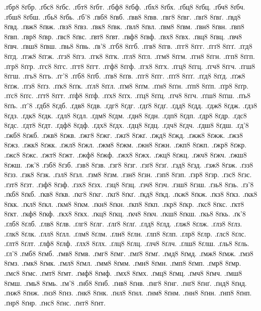 {.ґбр8 8ґбр.
.ґбс8 8ґбс.
.ґбт8 8ґбт.
.ґбф8 8ґбф.
.ґбх8 8ґбх.
.ґбц8 8ґбц.
.ґбч8 8ґбч.
.ґбш8 8ґбш.
.ґбь8 8ґбь.
.ґб'8
.ґвб8 8ґвб.
.ґвв8 8ґвв.
.ґвг8 8ґвг.
.ґвґ8 8ґвґ.
.ґвд8 8ґвд.
.ґвж8 8ґвж.
.ґвз8 8ґвз.
.ґвк8 8ґвк.
.ґвл8 8ґвл.
.ґвм8 8ґвм.
.ґвн8 8ґвн.
.ґвп8 8ґвп.
.ґвр8 8ґвр.
.ґвс8 8ґвс.
.ґвт8 8ґвт.
.ґвф8 8ґвф.
.ґвх8 8ґвх.
.ґвц8 8ґвц.
.ґвч8 8ґвч.
.ґвш8 8ґвш.
.ґвь8 8ґвь.
.ґв'8
.ґгб8 8ґгб.
.ґгв8 8ґгв.
.ґгг8 8ґгг.
.ґгґ8 8ґгґ.
.ґгд8 8ґгд.
.ґгж8 8ґгж.
.ґгз8 8ґгз.
.ґгк8 8ґгк.
.ґгл8 8ґгл.
.ґгм8 8ґгм.
.ґгн8 8ґгн.
.ґгп8 8ґгп.
.ґгр8 8ґгр.
.ґгс8 8ґгс.
.ґгт8 8ґгт.
.ґгф8 8ґгф.
.ґгх8 8ґгх.
.ґгц8 8ґгц.
.ґгч8 8ґгч.
.ґгш8 8ґгш.
.ґгь8 8ґгь.
.ґг'8
.ґґб8 8ґґб.
.ґґв8 8ґґв.
.ґґг8 8ґґг.
.ґґґ8 8ґґґ.
.ґґд8 8ґґд.
.ґґж8 8ґґж.
.ґґз8 8ґґз.
.ґґк8 8ґґк.
.ґґл8 8ґґл.
.ґґм8 8ґґм.
.ґґн8 8ґґн.
.ґґп8 8ґґп.
.ґґр8 8ґґр.
.ґґс8 8ґґс.
.ґґт8 8ґґт.
.ґґф8 8ґґф.
.ґґх8 8ґґх.
.ґґц8 8ґґц.
.ґґч8 8ґґч.
.ґґш8 8ґґш.
.ґґь8 8ґґь.
.ґґ'8
.ґдб8 8ґдб.
.ґдв8 8ґдв.
.ґдг8 8ґдг.
.ґдґ8 8ґдґ.
.ґдд8 8ґдд.
.ґдж8 8ґдж.
.ґдз8 8ґдз.
.ґдк8 8ґдк.
.ґдл8 8ґдл.
.ґдм8 8ґдм.
.ґдн8 8ґдн.
.ґдп8 8ґдп.
.ґдр8 8ґдр.
.ґдс8 8ґдс.
.ґдт8 8ґдт.
.ґдф8 8ґдф.
.ґдх8 8ґдх.
.ґдц8 8ґдц.
.ґдч8 8ґдч.
.ґдш8 8ґдш.
.ґд'8
.ґжб8 8ґжб.
.ґжв8 8ґжв.
.ґжг8 8ґжг.
.ґжґ8 8ґжґ.
.ґжд8 8ґжд.
.ґжж8 8ґжж.
.ґжз8 8ґжз.
.ґжк8 8ґжк.
.ґжл8 8ґжл.
.ґжм8 8ґжм.
.ґжн8 8ґжн.
.ґжп8 8ґжп.
.ґжр8 8ґжр.
.ґжс8 8ґжс.
.ґжт8 8ґжт.
.ґжф8 8ґжф.
.ґжх8 8ґжх.
.ґжц8 8ґжц.
.ґжч8 8ґжч.
.ґжш8 8ґжш.
.ґж'8
.ґзб8 8ґзб.
.ґзв8 8ґзв.
.ґзг8 8ґзг.
.ґзґ8 8ґзґ.
.ґзд8 8ґзд.
.ґзж8 8ґзж.
.ґзз8 8ґзз.
.ґзк8 8ґзк.
.ґзл8 8ґзл.
.ґзм8 8ґзм.
.ґзн8 8ґзн.
.ґзп8 8ґзп.
.ґзр8 8ґзр.
.ґзс8 8ґзс.
.ґзт8 8ґзт.
.ґзф8 8ґзф.
.ґзх8 8ґзх.
.ґзц8 8ґзц.
.ґзч8 8ґзч.
.ґзш8 8ґзш.
.ґзь8 8ґзь.
.ґз'8
.ґкб8 8ґкб.
.ґкв8 8ґкв.
.ґкг8 8ґкг.
.ґкґ8 8ґкґ.
.ґкд8 8ґкд.
.ґкж8 8ґкж.
.ґкз8 8ґкз.
.ґкк8 8ґкк.
.ґкл8 8ґкл.
.ґкм8 8ґкм.
.ґкн8 8ґкн.
.ґкп8 8ґкп.
.ґкр8 8ґкр.
.ґкс8 8ґкс.
.ґкт8 8ґкт.
.ґкф8 8ґкф.
.ґкх8 8ґкх.
.ґкц8 8ґкц.
.ґкч8 8ґкч.
.ґкш8 8ґкш.
.ґкь8 8ґкь.
.ґк'8
.ґлб8 8ґлб.
.ґлв8 8ґлв.
.ґлг8 8ґлг.
.ґлґ8 8ґлґ.
.ґлд8 8ґлд.
.ґлж8 8ґлж.
.ґлз8 8ґлз.
.ґлк8 8ґлк.
.ґлл8 8ґлл.
.ґлм8 8ґлм.
.ґлн8 8ґлн.
.ґлп8 8ґлп.
.ґлр8 8ґлр.
.ґлс8 8ґлс.
.ґлт8 8ґлт.
.ґлф8 8ґлф.
.ґлх8 8ґлх.
.ґлц8 8ґлц.
.ґлч8 8ґлч.
.ґлш8 8ґлш.
.ґль8 8ґль.
.ґл'8
.ґмб8 8ґмб.
.ґмв8 8ґмв.
.ґмг8 8ґмг.
.ґмґ8 8ґмґ.
.ґмд8 8ґмд.
.ґмж8 8ґмж.
.ґмз8 8ґмз.
.ґмк8 8ґмк.
.ґмл8 8ґмл.
.ґмм8 8ґмм.
.ґмн8 8ґмн.
.ґмп8 8ґмп.
.ґмр8 8ґмр.
.ґмс8 8ґмс.
.ґмт8 8ґмт.
.ґмф8 8ґмф.
.ґмх8 8ґмх.
.ґмц8 8ґмц.
.ґмч8 8ґмч.
.ґмш8 8ґмш.
.ґмь8 8ґмь.
.ґм'8
.ґнб8 8ґнб.
.ґнв8 8ґнв.
.ґнг8 8ґнг.
.ґнґ8 8ґнґ.
.ґнд8 8ґнд.
.ґнж8 8ґнж.
.ґнз8 8ґнз.
.ґнк8 8ґнк.
.ґнл8 8ґнл.
.ґнм8 8ґнм.
.ґнн8 8ґнн.
.ґнп8 8ґнп.
.ґнр8 8ґнр.
.ґнс8 8ґнс.
.ґнт8 8ґнт.
}
